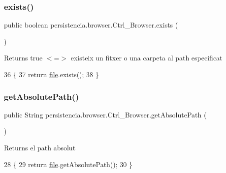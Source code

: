 \subsubsection{\texorpdfstring{exists()}{exists()}}
{\footnotesize\ttfamily public boolean persistencia.\+browser.\+Ctrl\+\_\+\+Browser.\+exists (\begin{DoxyParamCaption}{ }\end{DoxyParamCaption})\hspace{0.3cm}{\ttfamily [inline]}}

\begin{DoxyReturn}{Returns}
true $<$=$>$ existeix un fitxer o una carpeta al path especificat 
\end{DoxyReturn}

\begin{DoxyCode}
36                             \{
37         \textcolor{keywordflow}{return} \hyperlink{classpersistencia_1_1browser_1_1Ctrl__Browser_a72c151aed575c0848f7dbb1609b373c8}{file}.exists();
38     \}
\end{DoxyCode}
\mbox{\label{classpersistencia_1_1browser_1_1Ctrl__Browser_abdabfef6639c93ac5dc64f569b5b1d36}} 
\subsubsection{\texorpdfstring{get\+Absolute\+Path()}{getAbsolutePath()}}
{\footnotesize\ttfamily public String persistencia.\+browser.\+Ctrl\+\_\+\+Browser.\+get\+Absolute\+Path (\begin{DoxyParamCaption}{ }\end{DoxyParamCaption})\hspace{0.3cm}{\ttfamily [inline]}}

\begin{DoxyReturn}{Returns}
el path absolut 
\end{DoxyReturn}

\begin{DoxyCode}
28                                     \{
29         \textcolor{keywordflow}{return} \hyperlink{classpersistencia_1_1browser_1_1Ctrl__Browser_a72c151aed575c0848f7dbb1609b373c8}{file}.getAbsolutePath();
30     \}
\end{DoxyCode}
\mbox{\label{classpersistencia_1_1browser_1_1Ctrl__Browser_abdf13ea9a8d928b1efc6f3a69e18f6c6}} 
